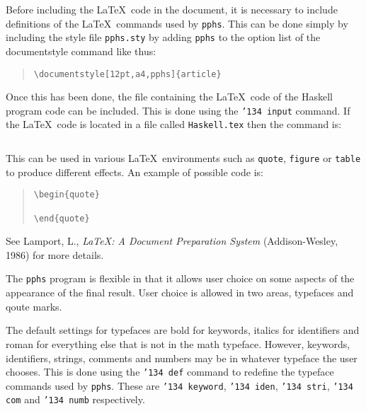Before including the \LaTeX\ code in the document, it is necessary
to include definitions of the \LaTeX\ commands used by {\tt pphs}.
This can be done simply by including the style file {\tt pphs.sty}
by adding {\tt pphs} to the option list of the documentstyle
command like thus:
\begin{quote}
\begin{verbatim}
\documentstyle[12pt,a4,pphs]{article}
\end{verbatim}
\end{quote}

Once this has been done, the file containing the \LaTeX\ code
of the Haskell program code can be included.  This is done
using the {\tt \char'134 input} command.  If the \LaTeX\
code is located in a file called {\tt Haskell.tex} then the
command is:
\begin{quote}
\begin{verbatim}

\end{verbatim}
\end{quote}
This can be used in various \LaTeX\ environments such as {\tt quote},
{\tt figure} or {\tt table} to produce different effects. An example
of possible code is:
\begin{quote}
\begin{verbatim}
\begin{quote}

\end{quote}
\end{verbatim}
\end{quote}
See Lamport, L.,  {\em \LaTeX : A Document Preparation System\/}
(Addison-Wesley, 1986) for more details.


The {\tt pphs} program is flexible in that it allows user choice on some aspects
of the appearance of the final result.  User choice is allowed in two areas, typefaces
and qoute marks.

The default settings for typefaces are bold for keywords, italics for identifiers and
roman for everything else that is not in the math typeface.  However, keywords, identifiers,
strings, comments and numbers may be in whatever typeface the user chooses.
This is done using the {\tt \char'134 def} command to redefine the typeface commands
used by {\tt pphs}.  These are {\tt \char'134 keyword}, {\tt \char'134 iden},
{\tt \char'134 stri}, {\tt \char'134 com} and {\tt \char'134 numb} respectively.

